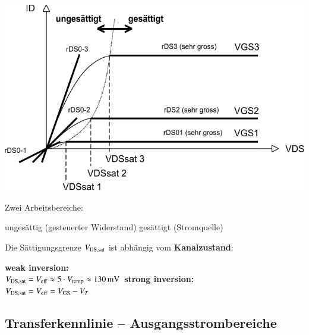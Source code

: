 \begin{minipage}[t]{0.5\columnwidth}
    \includegraphics[width=\columnwidth, align=t]{images/02_MOSFET_ausgangskennlinien.pdf}
\end{minipage}
\hfill
\begin{minipage}[t]{0.48\columnwidth}
    Zwei Arbeitsbereiche: 

    \begin{outline}
        \1 ungesättig (gesteuerter Widerstand)
        \1 gesättigt (Stromquelle)
    \end{outline}

    \medskip

    Die Sättigungsgrenze $V_{\rm DS, sat}$ ist abhängig vom \textbf{Kanalzustand}:

    \begin{outline}
        \1 \textbf{weak inversion:} \\
            $V_{\rm DS, sat} = V_{\rm eff} \approx 5 \cdot V_{\rm temp} \approx \qty{130}{\milli \volt}$ 
        \1 \textbf{strong inversion:} \\
            $V_{\rm DS, sat} = V_{\rm eff} = V_{\rm GS} - V_T$ 
    \end{outline}
\end{minipage}



\subsection{Transferkennlinie -- Ausgangsstrombereiche}


